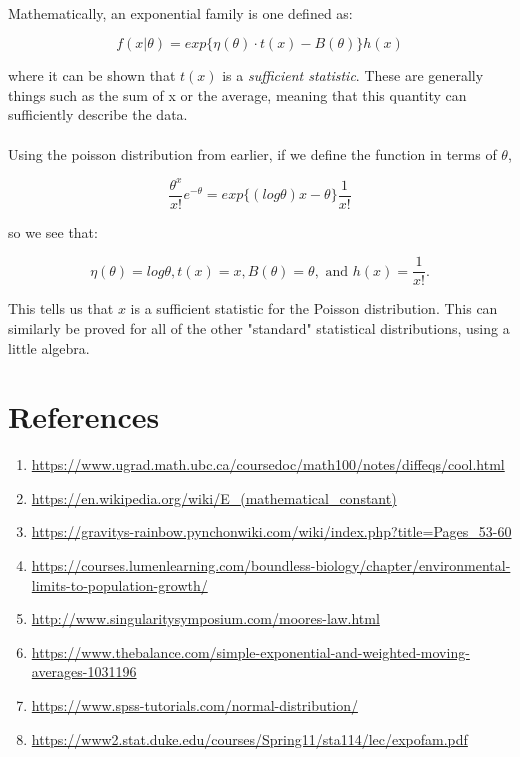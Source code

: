 \documentclass{cup-pan}
\begin{document}
\paragraph{} Mathematically, an exponential family is one defined as:

$$f(x|\theta) = exp\big\{ \eta(\theta) \cdot t(x) - B(\theta) \big\} h(x) $$

where it can be shown that $t(x)$ is a \textit{sufficient statistic}. These are generally things such as the sum of x or the average, meaning that this quantity can sufficiently describe the data.

\paragraph{}
Using the poisson distribution from earlier, if we define the function in terms of $\theta$,

$$\frac{\theta^x}{x!} \textit{e}^{-\theta} = exp \big\{ (log \theta) x - \theta \big\} \frac{1}{x!}$$ 

so we see that: 

$$\eta(\theta) = log \theta, t(x) = x, B(\theta) = \theta, \text{ and } h(x) = \frac{1}{x!}.$$

This tells us that $x$ is a sufficient statistic for the Poisson distribution. This can similarly be proved for all of the other "standard" statistical distributions, using a little algebra.

\vspace{10mm}

\section{References}

\begin{enumerate}
\item \url{https://www.ugrad.math.ubc.ca/coursedoc/math100/notes/diffeqs/cool.html}
\item \url{https://en.wikipedia.org/wiki/E_(mathematical_constant)}
\item \url{https://gravitys-rainbow.pynchonwiki.com/wiki/index.php?title=Pages_53-60}
\item \url{https://courses.lumenlearning.com/boundless-biology/chapter/environmental-limits-to-population-growth/}
\item \url{http://www.singularitysymposium.com/moores-law.html}
\item \url{https://www.thebalance.com/simple-exponential-and-weighted-moving-averages-1031196}
\item \url{https://www.spss-tutorials.com/normal-distribution/}
\item \url{https://www2.stat.duke.edu/courses/Spring11/sta114/lec/expofam.pdf}
\end{enumerate}
\end{document}
